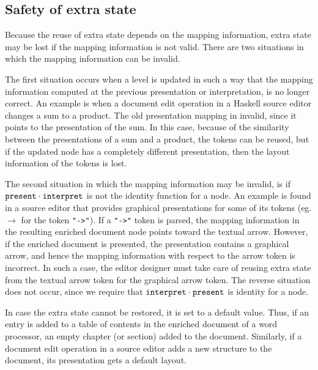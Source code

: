 \subsection{Safety of extra state}

Because the reuse of extra state depends on the mapping information, extra state may be lost if the mapping information is not valid. There are two situations in which the mapping information can be invalid.  

The first situation occurs when a level is updated in such a way that the mapping information computed at the previous presentation or interpretation, is no longer correct. An example is when a document edit operation in a Haskell source editor changes a sum to a product. The old presentation mapping in invalid, since it points to the presentation of the sum. In this case, because of the similarity between the presentations of a sum and a product, the tokens can be reused, but if the updated node has a completely different presentation, then the layout information of the tokens is lost. 

The second situation in which the mapping information may be invalid, is if 
${\tt present} \cdot {\tt interpret}$ is not the identity function for a node.  An example is found in a source editor that provides graphical presentations for some of its tokens (eg. $\rightarrow$ for the token \verb|"->"|). If a \verb|"->"| token is parsed, the mapping information in the resulting enriched document node points toward the textual arrow. However, if the enriched document is presented, the presentation contains a graphical arrow, and hence the mapping information with respect to the arrow token is incorrect. In such a case, the editor designer must take care of reusing extra state from the textual arrow token for the graphical arrow token. The reverse situation does not occur, since we require that ${\tt interpret} \cdot {\tt present}$ is identity for a node. 

In case the extra state cannot be restored, it is set to a default value. Thus, if an entry is added to a table of contents in the enriched document of a word processor, an empty chapter (or section) added to the document. Similarly, if a document edit operation in a source editor adds a new structure to the document, its presentation gets a default layout.

